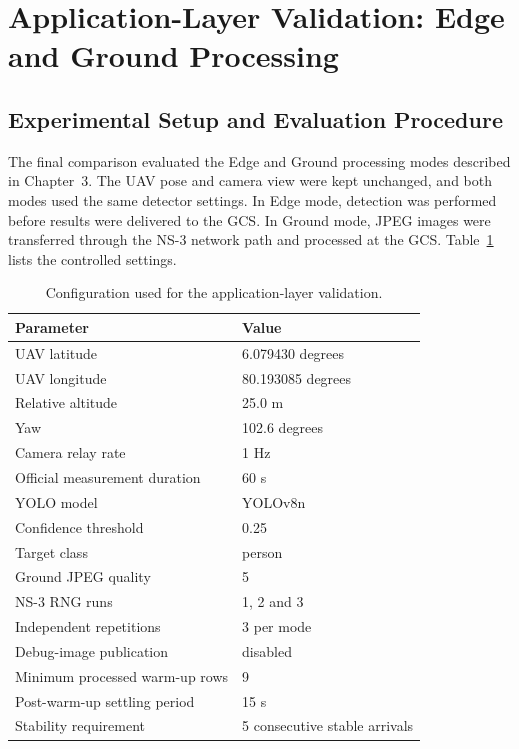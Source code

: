 \section{Application-Layer Validation: Edge and Ground Processing}
\label{sec:testing-detection}

\subsection{Experimental Setup and Evaluation Procedure}
\label{subsec:testing-detection-setup}

The final comparison evaluated the Edge and Ground processing modes described in Chapter~3. The \ac{UAV} pose and camera view were kept unchanged, and both modes used the same detector settings. In Edge mode, detection was performed before results were delivered to the \ac{GCS}. In Ground mode, JPEG images were transferred through the \ac{NS-3} network path and processed at the \ac{GCS}. Table~\ref{tab:application-test-configuration} lists the controlled settings.

\begin{table}[H]
    \centering
    \caption{Configuration used for the application-layer validation.}
    \label{tab:application-test-configuration}
    \begin{tabular}{|l|l|}
        \hline
        Parameter & Value \\ \hline
        \ac{UAV} latitude & 6.079430 degrees \\ \hline
        \ac{UAV} longitude & 80.193085 degrees \\ \hline
        Relative altitude & 25.0 m \\ \hline
        Yaw & 102.6 degrees \\ \hline
        Camera relay rate & 1 Hz \\ \hline
        Official measurement duration & 60 s \\ \hline
        YOLO model & YOLOv8n \\ \hline
        Confidence threshold & 0.25 \\ \hline
        Target class & person \\ \hline
        Ground JPEG quality & 5 \\ \hline
        \ac{NS-3} RNG runs & 1, 2 and 3 \\ \hline
        Independent repetitions & 3 per mode \\ \hline
        Debug-image publication & disabled \\ \hline
        Minimum processed warm-up rows & 9 \\ \hline
        Post-warm-up settling period & 15 s \\ \hline
        Stability requirement & 5 consecutive stable arrivals \\ \hline
    \end{tabular}
\end{table}

